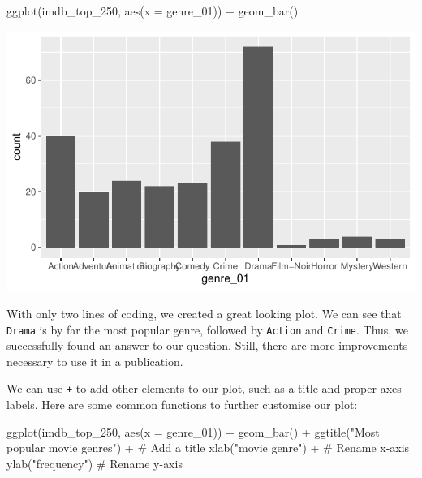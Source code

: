 \documentclass[
  letterpaper,
]{krantz}
\makeatletter
\newenvironment{Shaded}{\begin{snugshade}}{\end{snugshade}}
\newcommand{\AttributeTok}[1]{\textcolor[rgb]{0.40,0.45,0.13}{#1}}
\newcommand{\CommentTok}[1]{\textcolor[rgb]{0.37,0.37,0.37}{#1}}
\newcommand{\FunctionTok}[1]{\textcolor[rgb]{0.28,0.35,0.67}{#1}}
\newcommand{\NormalTok}[1]{\textcolor[rgb]{0.00,0.23,0.31}{#1}}
\newcommand{\SpecialCharTok}[1]{\textcolor[rgb]{0.37,0.37,0.37}{#1}}
\newcommand{\StringTok}[1]{\textcolor[rgb]{0.13,0.47,0.30}{#1}}
\newenvironment{kframe}{%
\medskip{}
\setlength{\fboxsep}{.8em}
 \def\at@end@of@kframe{}%
 \ifinner\ifhmode%
  \def\at@end@of@kframe{\end{minipage}}%
  \begin{minipage}{\columnwidth}%
 \fi\fi%
 \def\FrameCommand##1{\hskip\@totalleftmargin \hskip-\fboxsep
 \colorbox{shadecolor}{##1}\hskip-\fboxsep
     \hskip-\linewidth \hskip-\@totalleftmargin \hskip\columnwidth}%
 \MakeFramed {\advance\hsize-\width
   \@totalleftmargin\z@ \linewidth\hsize
   \@setminipage}}%
 {\par\unskip\endMakeFramed%
 \at@end@of@kframe}
\renewenvironment{Shaded}{\begin{kframe}}{\end{kframe}}
\makeatother
\begin{document}
\begin{Shaded}
\begin{Highlighting}[]
\FunctionTok{ggplot}\NormalTok{(imdb\_top\_250, }\FunctionTok{aes}\NormalTok{(}\AttributeTok{x =}\NormalTok{ genre\_01)) }\SpecialCharTok{+}
  \FunctionTok{geom\_bar}\NormalTok{()}
\end{Highlighting}
\end{Shaded}

\includegraphics{08_descriptive_statistics_files/figure-pdf/most-popular genre-with-barplot-1.pdf}

With only two lines of coding, we created a great looking plot. We can
see that \texttt{Drama} is by far the most popular genre, followed by
\texttt{Action} and \texttt{Crime}. Thus, we successfully found an
answer to our question. Still, there are more improvements necessary to
use it in a publication.

We can use \texttt{+} to add other elements to our plot, such as a title
and proper axes labels. Here are some common functions to further
customise our plot:

\begin{Shaded}
\begin{Highlighting}[]
\FunctionTok{ggplot}\NormalTok{(imdb\_top\_250, }\FunctionTok{aes}\NormalTok{(}\AttributeTok{x =}\NormalTok{ genre\_01)) }\SpecialCharTok{+}
  \FunctionTok{geom\_bar}\NormalTok{() }\SpecialCharTok{+}
  \FunctionTok{ggtitle}\NormalTok{(}\StringTok{"Most popular movie genres"}\NormalTok{) }\SpecialCharTok{+}  \CommentTok{\# Add a title}
  \FunctionTok{xlab}\NormalTok{(}\StringTok{"movie genre"}\NormalTok{) }\SpecialCharTok{+}                   \CommentTok{\# Rename x{-}axis}
  \FunctionTok{ylab}\NormalTok{(}\StringTok{"frequency"}\NormalTok{)                       }\CommentTok{\# Rename y{-}axis}
\end{Highlighting}
\end{Shaded}
\end{document}
